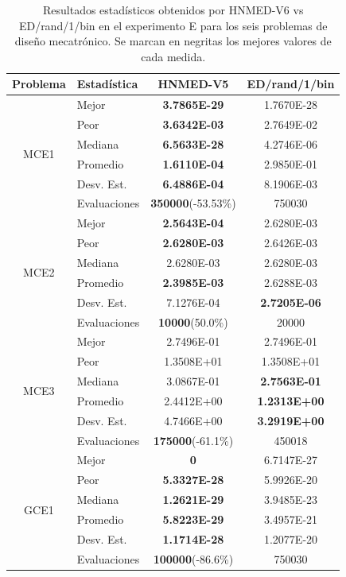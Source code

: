 \begin{table}
	\centering
	\caption[Resultados estadísticos obtenidos por HNMED-V6 vs ED/rand/1/bin en el experimento E
		para los seis problemas de diseño mecatrónico.]{Resultados estadísticos obtenidos por HNMED-V6 vs ED/rand/1/bin en el experimento E
		para los seis problemas de diseño mecatrónico. Se marcan en negritas los
		mejores valores de cada medida.} \label{tab:Resultados estadísticos obtenidos por variantes HNMED6 y ED  en experimento E.}
	\begin{tabular}{clcc} 
		\hline
		Problema              & Estadística  & HNMED-V5 & ED/rand/1/bin  \\ 
		\hline
		\multirow{6}{*}{MCE1} & Mejor        & \textbf{3.7865E-29} &1.7670E-28          \\
		& Peor         &\textbf{3.6342E-03}&2.7649E-02
		\\
		& Mediana      &\textbf{6.5633E-28}&4.2746E-06            \\
		& Promedio     &\textbf{1.6110E-04}&2.9850E-01            \\
		& Desv. Est.   &\textbf{6.4886E-04}& 8.1906E-03
		\\
		& Evaluaciones &\textbf{350000}(-53.53\%)  &  750030       \\
		\hline
		
		\multirow{6}{*}{MCE2} & Mejor        &\textbf{2.5643E-04}&2.6280E-03
		\\
		& Peor         &\textbf{2.6280E-03}&2.6426E-03  \\
		& Mediana      &2.6280E-03&2.6280E-03   \\
		& Promedio     &\textbf{2.3985E-03}&2.6288E-03   \\
		& Desv. Est.   &7.1276E-04&\textbf{2.7205E-06} \\
		& Evaluaciones &\textbf{10000}(50.0\%) &20000                \\
		\hline
		
		\multirow{6}{*}{MCE3} & Mejor        &2.7496E-01&2.7496E-01  \\
		& Peor         &1.3508E+01&1.3508E+01     \\
		& Mediana      &3.0867E-01&\textbf{2.7563E-01} \\
		& Promedio     &2.4412E+00&\textbf{1.2313E+00}\\
		& Desv. Est.   &4.7466E+00&\textbf{3.2919E+00}\\
		& Evaluaciones &\textbf{175000}(-61.1\%)& 450018 \\
		\hline
		\multirow{6}{*}{GCE1} & Mejor        &\textbf{0}&6.7147E-27\\
		& Peor         &\textbf{5.3327E-28}&5.9926E-20\\
		& Mediana      &\textbf{1.2621E-29}&3.9485E-23\\
		& Promedio     &\textbf{5.8223E-29}&3.4957E-21\\
		& Desv. Est.   &\textbf{1.1714E-28}&1.2077E-20\\
		& Evaluaciones &\textbf{100000}(-86.6\%)&750030 \\
		\hline
		

\end{tabular}
\end{table}
